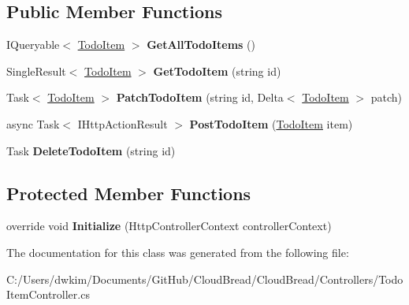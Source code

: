 \subsection*{Public Member Functions}
\begin{DoxyCompactItemize}
\item 
I\+Queryable$<$ \hyperlink{class_cloud_bread_1_1_data_objects_1_1_todo_item}{Todo\+Item} $>$ {\bfseries Get\+All\+Todo\+Items} ()\hypertarget{class_cloud_bread_1_1_controllers_1_1_todo_item_controller_a398f4bd7f64525eeb81d5c9c8efcaaaa}{}\label{class_cloud_bread_1_1_controllers_1_1_todo_item_controller_a398f4bd7f64525eeb81d5c9c8efcaaaa}

\item 
Single\+Result$<$ \hyperlink{class_cloud_bread_1_1_data_objects_1_1_todo_item}{Todo\+Item} $>$ {\bfseries Get\+Todo\+Item} (string id)\hypertarget{class_cloud_bread_1_1_controllers_1_1_todo_item_controller_a02499ac4f50528b41b89b02862751a64}{}\label{class_cloud_bread_1_1_controllers_1_1_todo_item_controller_a02499ac4f50528b41b89b02862751a64}

\item 
Task$<$ \hyperlink{class_cloud_bread_1_1_data_objects_1_1_todo_item}{Todo\+Item} $>$ {\bfseries Patch\+Todo\+Item} (string id, Delta$<$ \hyperlink{class_cloud_bread_1_1_data_objects_1_1_todo_item}{Todo\+Item} $>$ patch)\hypertarget{class_cloud_bread_1_1_controllers_1_1_todo_item_controller_ac6bb62e5c6bfaeda1a49c85451adbe02}{}\label{class_cloud_bread_1_1_controllers_1_1_todo_item_controller_ac6bb62e5c6bfaeda1a49c85451adbe02}

\item 
async Task$<$ I\+Http\+Action\+Result $>$ {\bfseries Post\+Todo\+Item} (\hyperlink{class_cloud_bread_1_1_data_objects_1_1_todo_item}{Todo\+Item} item)\hypertarget{class_cloud_bread_1_1_controllers_1_1_todo_item_controller_a334545b9f651cc161b2218d22ebcf15e}{}\label{class_cloud_bread_1_1_controllers_1_1_todo_item_controller_a334545b9f651cc161b2218d22ebcf15e}

\item 
Task {\bfseries Delete\+Todo\+Item} (string id)\hypertarget{class_cloud_bread_1_1_controllers_1_1_todo_item_controller_a618193fc125f6df8bf754a077e4b6b8d}{}\label{class_cloud_bread_1_1_controllers_1_1_todo_item_controller_a618193fc125f6df8bf754a077e4b6b8d}

\end{DoxyCompactItemize}
\subsection*{Protected Member Functions}
\begin{DoxyCompactItemize}
\item 
override void {\bfseries Initialize} (Http\+Controller\+Context controller\+Context)\hypertarget{class_cloud_bread_1_1_controllers_1_1_todo_item_controller_a3520799d8af1b44b08f47790cf91d990}{}\label{class_cloud_bread_1_1_controllers_1_1_todo_item_controller_a3520799d8af1b44b08f47790cf91d990}

\end{DoxyCompactItemize}


The documentation for this class was generated from the following file\+:\begin{DoxyCompactItemize}
\item 
C\+:/\+Users/dwkim/\+Documents/\+Git\+Hub/\+Cloud\+Bread/\+Cloud\+Bread/\+Controllers/Todo\+Item\+Controller.\+cs\end{DoxyCompactItemize}
